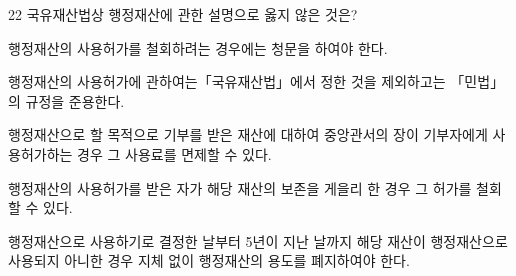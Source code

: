 \begin{question}{22}
국유재산법상 행정재산에 관한 설명으로 옳지 않은 것은?
\begin{choices}
  \item 행정재산의 사용허가를 철회하려는 경우에는 청문을 하여야 한다.
  \item 행정재산의 사용허가에 관하여는「국유재산법」에서 정한 것을 제외하고는 「민법」의 규정을 준용한다.
  \item 행정재산으로 할 목적으로 기부를 받은 재산에 대하여 중앙관서의 장이 기부자에게 사용허가하는 경우 그 사용료를 면제할 수 있다.
  \item 행정재산의 사용허가를 받은 자가 해당 재산의 보존을 게을리 한 경우 그 허가를 철회할 수 있다.
  \item 행정재산으로 사용하기로 결정한 날부터 5년이 지난 날까지 해당 재산이 행정재산으로 사용되지 아니한 경우 지체 없이 행정재산의 용도를 폐지하여야 한다.
\end{choices}
\end{question}
